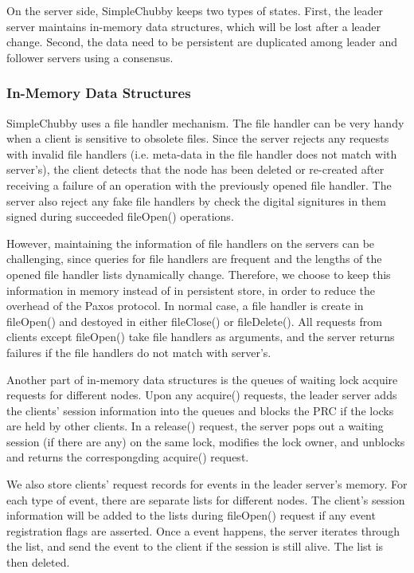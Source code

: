 On the server side, SimpleChubby keeps two types of states. First, the
leader server maintains in-memory data structures, which will be lost
after a leader change. Second, the data need to be persistent are duplicated
among leader and follower servers using a consensus.



\subsubsection{In-Memory Data Structures}

SimpleChubby uses a file handler mechanism. The file handler can be very
handy when a client is sensitive to obsolete files. Since the server
rejects any requests with invalid file handlers (i.e. meta-data in the file
handler does not match with server's), the client detects that the node has
been deleted or re-created after receiving a failure of an operation with
the previously opened file handler. The server also reject any fake file
handlers by check the digital signitures in them signed during succeeded
fileOpen() operations.

However, maintaining the information of file handlers on the servers can
be challenging, since queries for file handlers are frequent and the lengths
of the opened file handler lists dynamically change. Therefore, we choose
to keep this information in memory instead of in persistent store, in order
to reduce the overhead of the Paxos protocol. In normal case, a file handler
is create in fileOpen() and destoyed in either fileClose() or fileDelete().
All requests from clients except fileOpen() take file handlers as arguments,
and the server returns failures if the file handlers do not match with
server's.

Another part of in-memory data structures is the queues of waiting lock acquire
requests for different nodes. Upon any acquire() requests, the leader server
adds the clients' session information into the queues and blocks the PRC
if the locks are held by other clients.
In a release() request, the server pops out a waiting session
(if there are any) on the same lock, modifies the lock owner, and unblocks and
returns the correspongding acquire() request.

We also store clients' request records for events in the leader server's memory.
For each type of event, there are separate lists for different nodes.
The client's session information will be added to the lists during fileOpen()
request if any event registration flags are asserted. Once a event happens,
the server iterates through the list, and send the event to the client if the
session is still alive. The list is then deleted.



